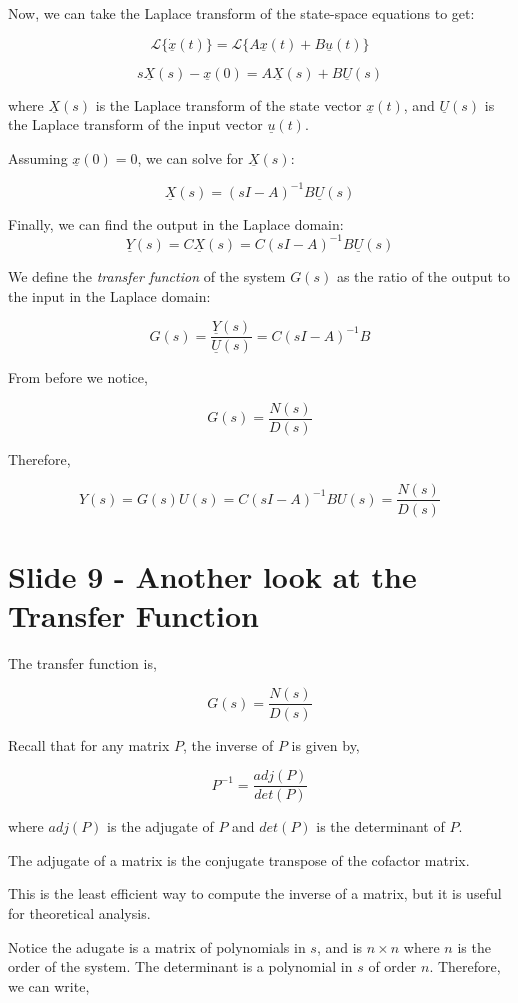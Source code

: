 \documentclass[
  letterpaper,
  DIV=11,
  numbers=noendperiod]{scrreprt}
\begin{document}
Now, we can take the Laplace transform of the state-space equations to
get:

\[\mathcal{L}\{\dot{\underline{x}}(t)\} = \mathcal{L}\{A\underline{x}(t) + B\underline{u}(t)\}\]

\[ s\underline{X}(s) - \underline{x}(0) = A\underline{X}(s) + B\underline{U}(s) \]

where \(\underline{X}(s)\) is the Laplace transform of the state vector
\(\underline{x}(t)\), and \(\underline{U}(s)\) is the Laplace transform
of the input vector \(\underline{u}(t)\).

Assuming \(\underline{x}(0) = 0\), we can solve for
\(\underline{X}(s)\):

\[ \underline{X}(s) = (sI - A)^{-1}B\underline{U}(s) \]

Finally, we can find the output in the Laplace domain:
\[ \underline{Y}(s) = C\underline{X}(s) = C(sI - A)^{-1}B\underline{U}(s) \]

We define the \emph{transfer function} of the system \(G(s)\) as the
ratio of the output to the input in the Laplace domain:

\[ G(s) = \frac{\underline{Y}(s)}{\underline{U}(s)} = C(sI - A)^{-1}B \]

From before we notice,

\[ G(s) = \frac{N(s)}{D(s)}\]

Therefore,

\[ Y(s) = G(s)U(s) = C(sI - A)^{-1}BU(s) = \frac{N(s)}{D(s)}\]

\section{Slide 9 - Another look at the Transfer
Function}\label{slide-9---another-look-at-the-transfer-function}

The transfer function is,

\[ G(s) = \frac{N(s)}{D(s)}\]

Recall that for any matrix \(P\), the inverse of \(P\) is given by,

\[ P^{-1} = \frac{adj(P)}{det(P)}\]

where \(adj(P)\) is the adjugate of \(P\) and \(det(P)\) is the
determinant of \(P\).

The adjugate of a matrix is the conjugate transpose of the cofactor
matrix.

This is the least efficient way to compute the inverse of a matrix, but
it is useful for theoretical analysis.

Notice the adugate is a matrix of polynomials in \(s\), and is
\(n \times n\) where \(n\) is the order of the system. The determinant
is a polynomial in \(s\) of order \(n\). Therefore, we can write,
\end{document}
